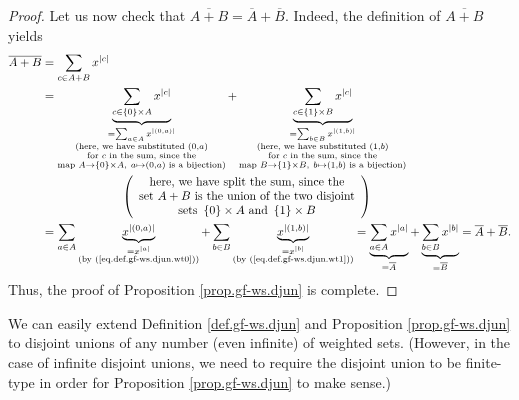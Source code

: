 \begin{proof}
Let us now check that $\overline{A+B}=\overline{A}+\overline{B}$. Indeed, the
definition of $\overline{A+B}$ yields%
\begin{align*}
\overline{A+B}  &  =\sum_{c\in A+B}x^{\left\vert c\right\vert }\\
&  =\underbrace{\sum_{c\in\left\{  0\right\}  \times A}x^{\left\vert
c\right\vert }}_{\substack{=\sum_{a\in A}x^{\left\vert \left(  0,a\right)
\right\vert }\\\text{(here, we have substituted }\left(  0,a\right)
\\\text{for }c\text{ in the sum, since the}\\\text{map }A\rightarrow\left\{
0\right\}  \times A,\ a\mapsto\left(  0,a\right)  \text{ is a bijection)}%
}}+\underbrace{\sum_{c\in\left\{  1\right\}  \times B}x^{\left\vert
c\right\vert }}_{\substack{=\sum_{b\in B}x^{\left\vert \left(  1,b\right)
\right\vert }\\\text{(here, we have substituted }\left(  1,b\right)
\\\text{for }c\text{ in the sum, since the}\\\text{map }B\rightarrow\left\{
1\right\}  \times B,\ b\mapsto\left(  1,b\right)  \text{ is a bijection)}}}\\
&  \ \ \ \ \ \ \ \ \ \ \ \ \ \ \ \ \ \ \ \ \left(
\begin{array}
[c]{c}%
\text{here, we have split the sum, since the}\\
\text{set }A+B\text{ is the union of the two disjoint}\\
\text{sets }\left\{  0\right\}  \times A\text{ and }\left\{  1\right\}  \times
B
\end{array}
\right) \\
&  =\sum_{a\in A}\underbrace{x^{\left\vert \left(  0,a\right)  \right\vert }%
}_{\substack{=x^{\left\vert a\right\vert }\\\text{(by
(\ref{eq.def.gf-ws.djun.wt0}))}}}+\sum_{b\in B}\underbrace{x^{\left\vert
\left(  1,b\right)  \right\vert }}_{\substack{=x^{\left\vert b\right\vert
}\\\text{(by (\ref{eq.def.gf-ws.djun.wt1}))}}}=\underbrace{\sum_{a\in
A}x^{\left\vert a\right\vert }}_{=\overline{A}}+\underbrace{\sum_{b\in
B}x^{\left\vert b\right\vert }}_{=\overline{B}}=\overline{A}+\overline{B}.
\end{align*}
Thus, the proof of Proposition \ref{prop.gf-ws.djun} is complete.
\end{proof}

We can easily extend Definition \ref{def.gf-ws.djun} and Proposition
\ref{prop.gf-ws.djun} to disjoint unions of any number (even infinite) of
weighted sets. (However, in the case of infinite disjoint unions, we need to
require the disjoint union to be finite-type in order for Proposition
\ref{prop.gf-ws.djun} to make sense.)

